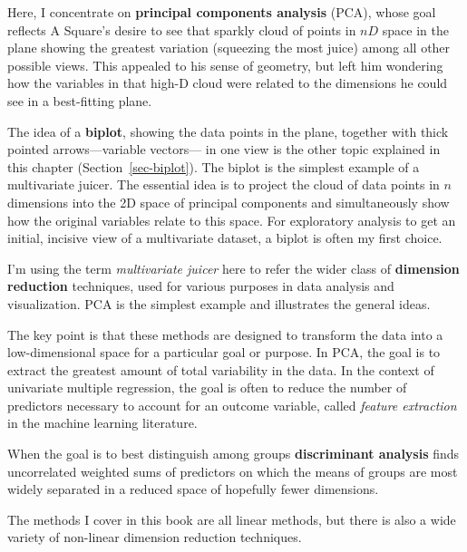 \documentclass[
  letterpaper,
  10pt,
  krantz2]{krantz}
\begin{document}
Here, I concentrate on \textbf{principal components analysis} (PCA),
whose goal reflects A Square's desire to see that sparkly cloud of
points in \(nD\) space in the plane showing the greatest variation
(squeezing the most juice) among all other possible views. This appealed
to his sense of geometry, but left him wondering how the variables in
that high-D cloud were related to the dimensions he could see in a
best-fitting plane.

The idea of a \textbf{biplot}, showing the data points in the plane,
together with thick pointed arrows---variable vectors--- in one view is
the other topic explained in this chapter (Section~\ref{sec-biplot}).
The biplot is the simplest example of a multivariate juicer. The
essential idea is to project the cloud of data points in \(n\)
dimensions into the 2D space of principal components and simultaneously
show how the original variables relate to this space. For exploratory
analysis to get an initial, incisive view of a multivariate dataset, a
biplot is often my first choice.

\begin{tcolorbox}[enhanced jigsaw, leftrule=.75mm, toprule=.15mm, bottomtitle=1mm, opacityback=0, colbacktitle=quarto-callout-note-color!10!white, breakable, opacitybacktitle=0.6, colback=white, coltitle=black, toptitle=1mm, titlerule=0mm, rightrule=.15mm, title=\textcolor{quarto-callout-note-color}{\faInfo}\hspace{0.5em}{Looking ahead}, colframe=quarto-callout-note-color-frame, arc=.35mm, bottomrule=.15mm, left=2mm]

I'm using the term \emph{multivariate juicer} here to refer the wider
class of \textbf{dimension reduction} techniques, used for various
purposes in data analysis and visualization. PCA is the simplest example
and illustrates the general ideas.

The key point is that these methods are designed to transform the data
into a low-dimensional space for a particular goal or purpose. In PCA,
the goal is to extract the greatest amount of total variability in the
data. In the context of univariate multiple regression, the goal is
often to reduce the number of predictors necessary to account for an
outcome variable, called \emph{feature extraction} in the machine
learning literature.

When the goal is to best distinguish among groups \textbf{discriminant
analysis} finds uncorrelated weighted sums of predictors on which the
means of groups are most widely separated in a reduced space of
hopefully fewer dimensions.

The methods I cover in this book are all linear methods, but there is
also a wide variety of non-linear dimension reduction techniques.

\end{tcolorbox}
\end{document}
